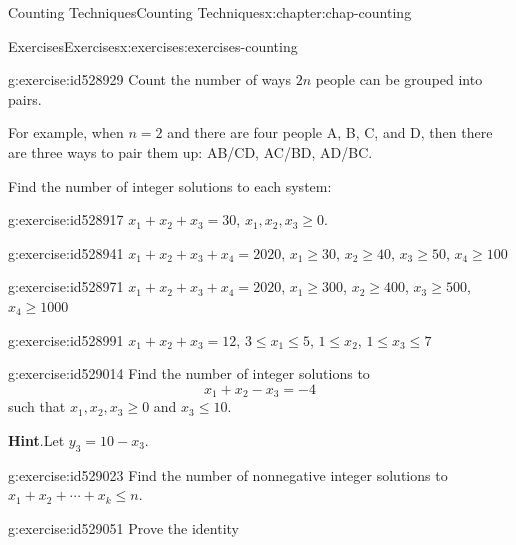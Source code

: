 \documentclass[oneside,10pt,]{book}
\newcommand{\blocktitlefont}{\relax}
\numberwithin{equation}{section}
\begin{document}
\begin{chapterptx}{Counting Techniques}{}{Counting Techniques}{}{}{x:chapter:chap-counting}
\begin{exercises-section}{Exercises}{}{Exercises}{}{}{x:exercises:exercises-counting}
\begin{divisionexercise}{18}{}{}{g:exercise:id528929}
Count the number of ways \(2n\) people can be grouped into pairs.%
\par
For example, when \(n = 2\) and there are four people A, B, C, and D, then there are three ways to pair them up: AB\slash{}CD, AC\slash{}BD, AD\slash{}BC.%
\end{divisionexercise}%
\par\medskip\noindent%
%
Find the number of integer solutions to each system:%
\begin{exercisegroup}
\begin{divisionexerciseeg}{19}{}{}{g:exercise:id528917}%
\(x_1 + x_2 + x_3 = 30\), \(x_1, x_2, x_3 \geq 0\).%
\end{divisionexerciseeg}%
\begin{divisionexerciseeg}{20}{}{}{g:exercise:id528941}%
\(x_1 + x_2 + x_3 + x_4 = 2020\), \(x_1 \geq 30\), \(x_2 \geq 40\), \(x_3 \geq 50\), \(x_4 \geq 100\)%
\end{divisionexerciseeg}%
\begin{divisionexerciseeg}{21}{}{}{g:exercise:id528971}%
\(x_1 + x_2 + x_3 + x_4 = 2020\), \(x_1 \geq 300\), \(x_2 \geq 400\), \(x_3 \geq 500\), \(x_4 \geq 1000\)%
\end{divisionexerciseeg}%
\begin{divisionexerciseeg}{22}{}{}{g:exercise:id528991}%
\(x_1 + x_2 + x_3 = 12\), \(3 \leq x_1 \leq 5\), \(1 \leq x_2\), \(1 \leq x_3 \leq 7\)%
\end{divisionexerciseeg}%
\end{exercisegroup}
\par\medskip\noindent
\begin{divisionexercise}{23}{}{}{g:exercise:id529014}%
Find the number of integer solutions to%
\begin{equation*}
x_1 + x_2 - x_3 = -4
\end{equation*}
such that \(x_1, x_2, x_3 \geq 0\) and \(x_3 \leq 10\).%
\par\smallskip%
\noindent\textbf{\blocktitlefont Hint}.\hypertarget{g:hint:id529015}{}\quad{}Let \(y_3 = 10 - x_3\).%
\end{divisionexercise}%
\begin{divisionexercise}{24}{}{}{g:exercise:id529023}%
Find the number of nonnegative integer solutions to \(x_1 + x_2 + \cdots + x_k \leq n\).%
\end{divisionexercise}%
\begin{divisionexercise}{25}{}{}{g:exercise:id529051}%
Prove the identity%
\begin{equation*}

\end{equation*}
\end{divisionexercise}
\end{exercises-section}
\end{chapterptx}
\end{document}
